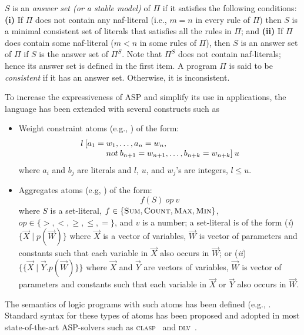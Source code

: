 \documentclass{article}
\def\naf{\: {not} \:}
\begin{document}
$S$ is an \emph{answer set (or a stable model)} of $\Pi$ \cite{GelfondL90} if it
satisfies the following conditions: 
{\bf (i)}  If $\Pi$ does not contain any naf-literal
(i.e., $m=n$ in every rule of $\Pi$) then $S$ is a minimal 
consistent set of literals that satisfies all the rules in $\Pi$; and
{\bf (ii)} If $\Pi$ does contain some naf-literal
($m < n$ in some rules of $\Pi$), then $S$ is an answer set of
$\Pi$ if $S$ is the answer set of $\Pi^S$. Note that $\Pi^S$ does
not contain naf-literals; hence its answer set is defined in the first
item.
A program $\Pi$ is said to be \emph{consistent} if it has an
 answer set. Otherwise, it is inconsistent. 


To increase the expressiveness of ASP and  
simplify its use in applications, the language
 has been extended with several constructs such as 
\begin{itemize} 
\item Weight constraint atoms (e.g., \cite{nie99b})
of the form: 
\begin{equation}
\label{weight}
\begin{array}{l}
  l\: [a_1 = w_1, \ldots, a_n = w_n, \\
  \hspace*{.4in}{\naf} b_{n+1} = w_{n+1},\ldots,b_{n+k} = w_{n+k} ]\: u 
\end{array}
\end{equation}
%
where $a_i$ and $b_j$ are literals and $l$, $u$, and $w_j$'s are integers,
$l \le u$. 
 

\item Aggregates atoms (e.g, \cite{faberLP04,PelovDB04,SonP05})
 of the form:
\begin{equation}
\label{weight}
f(S) \: op \: v
\end{equation} 
where $S$ is a set-literal, $f \in \{\textnormal{\sc Sum}, \textnormal{\sc Count},
\textnormal{\sc Max}, \textnormal{\sc Min} \}$, 
$op \in \{>, <, \ge, \le, =\}$, 
and $v$ is a number; a set-literal is of the form   
({\em i}) $\{\vec{X} \mid p(\vec{W})\}$ where $\vec{X}$ is a vector of variables, $\vec{W}$ is vector of parameters and constants such that each variable in $\vec{X}$ also occurs in $\vec{W}$; 
or ({\em ii}) $\{\!\!\{\vec{X} \mid \vec{Y}. p(\vec{W})\}\!\!\}$ where $\vec{X}$ and $\vec{Y}$ are vectors of variables, $\vec{W}$ is vector of parameters and constants such that each variable in $\vec{X}$ or $\vec{Y}$ also occurs in $\vec{W}$.

\end{itemize}  
The semantics of logic programs with such atoms has been defined  (e.g., \cite{faberLP04,nie99b,PelovDB04,SonP05}. Standard syntax for these types of atoms has been proposed and adopted in most state-of-the-art ASP-solvers such as 
\textsc{clasp}~\cite{GebserKNS07} and \textsc{dlv}~\cite{dlv97}. 
\end{document}
